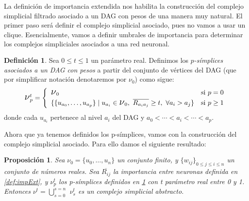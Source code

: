 \documentclass[12pt, a4paper, twoside]{book}
\numberwithin{equation}{section}
\theoremstyle{definition}
\newtheorem{defi}{Definición}[section]
\theoremstyle{remark}
\theoremstyle{plain}
\newtheorem{prop}{Proposición}
\begin{document}
	La definición de importancia extendida nos habilita la construcción 
	del complejo simplicial filtrado asociado a un DAG con pesos de una 
	manera muy natural. El primer paso será definir el complejo 
	simplicial asociado, pues no vamos a usar un clique. Esencialmente, 
	vamos a definir umbrales de importancia para determinar los complejos
	simpliciales asociados a una red neuronal.

	\begin{defi}
		\label{def:SimpAut}
		Sea $0\leq t \leq 1$ un parámetro real. Definimos los 
		\textit{$p$-símplices asociados a un DAG con pesos} a partir 
		del conjunto de vértices del DAG (que por simplificar notación 
		denotaremos por {\Large $\nu$}$_{0}$) 
		como sigue:
	\begin{equation*}
		\text{{\Large $\nu$}}_{p}^{t}=
		\left \{
			\begin{array}{ll}
				\text{{\Large $\nu$}}_{0} & \text{si } p=0\\[3pt]
				\{\{u_{a_{0}},\dots,u_{a_{p}}\} \mid u_{a_{i}} \in 
					\text{{\Large $\nu$}}_{0},\ 
					\overline{R_{a_{i}a_{j}}} \geq t,\ 
				\forall a_{i} > a_{j} \} & \text{si } p \geq 1
			\end{array}
		\right.  
	\end{equation*}
	donde cada $u_{a_{i}}$ pertenece al nivel $a_{i}$ del DAG y $a_{0} 
	< \cdots < a_{i} < \cdots < a_{p}$.
	\end{defi}
	Ahora que ya tenemos definidos los p-símplices, vamos con la 
	construcción del complejo simplicial asociado. Para ello damos el 
	siguiente resultado:
	\begin{prop}
		Sea {\Large $\nu$}$_{0}=\{u_{0},\dots,u_{n}\}$ un conjunto 
		finito, y $\{w_{ij}\}_{0\leq j \leq i \leq n}$ un 
		conjunto de números reales. Sea $\overline{R_{ij}}$ la 
		importancia entre neuronas definida en \ref{def:impExt}, y 
		{\Large $\nu$}$_{p}^{t}$ los p-símplices definidos en 
		\ref{def:SimpAut} con t parámetro real entre 0 y 1. Entonces 
		{\Large $\nu$}$^{t}=\bigcup_{s=0}^{s=n}$
		{\Large $\nu$}$_{s}^{t}$ 
		es un complejo simplicial abstracto. 
		\label{prop:cs}
	\end{prop}
\end{document}
